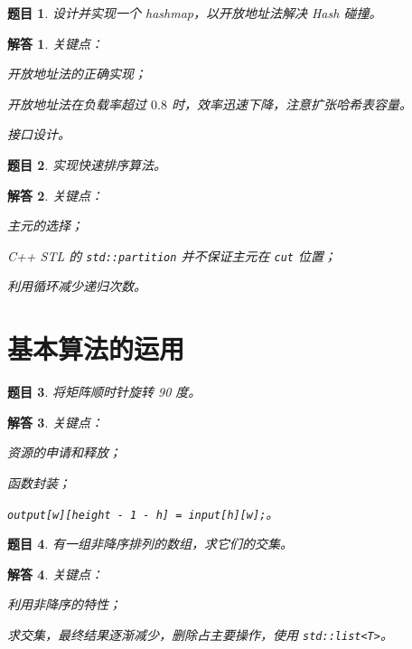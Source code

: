 \documentclass[UTF8, final]{ctexart}
\newtheorem{question}{题目}
\newtheorem{solution}{解答}
\begin{document}
\begin{question}
设计并实现一个 hashmap，以开放地址法解决 Hash 碰撞。
\end{question}
\begin{solution}
关键点：
\begin{compactitem}
    \item 开放地址法的正确实现；
    \item 开放地址法在负载率超过 $0.8$ 时，效率迅速下降，注意扩张哈希表容量。
    \item 接口设计。
\end{compactitem}

\end{solution}

\begin{question}
实现快速排序算法。
\end{question}
\begin{solution}
关键点：
\begin{compactitem}
    \item 主元的选择；
    \item C++ STL 的 \lstinline[style = lcpp]|std::partition| 并不保证主元在 \lstinline[style = lcpp]|cut| 位置；
    \item 利用循环减少递归次数。
\end{compactitem}

\end{solution}

\section{基本算法的运用}
\begin{question}
将矩阵顺时针旋转 90 度。
\end{question}
\begin{solution}
关键点：
\begin{compactitem}
    \item 资源的申请和释放；
    \item 函数封装；
    \item \lstinline[style = lcpp]|output[w][height - 1 - h] = input[h][w];|。
\end{compactitem}

\end{solution}

\begin{question}
有一组非降序排列的数组，求它们的交集。
\end{question}
\begin{solution}
关键点：
\begin{compactitem}
    \item 利用非降序的特性；
    \item 求交集，最终结果逐渐减少，删除占主要操作，使用 \lstinline[style = lcpp]|std::list<T>|。
\end{compactitem}

\end{solution}
\end{document}
